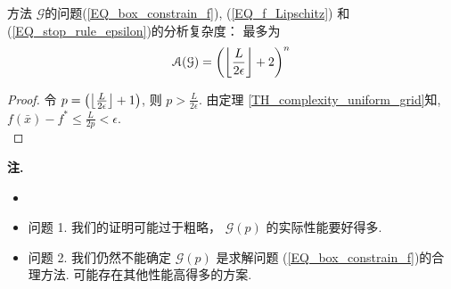 \documentclass[handout]{beamer}
\begin{document}
\begin{frame}[allowframebreaks]
\begin{corollary}
    方法 $\mathcal{G}$的问题(\ref{EQ_box_constrain_f}), (\ref{EQ_f_Lipschitz}) 和  (\ref{EQ_stop_rule_epsilon})的分析复杂度：
     最多为
    \begin{equation*}
        \mathcal{A}(\mathcal{G}) = \left( \bigg{\lfloor}\frac{L}{2\epsilon}\bigg{\rfloor}  +2 \right)^{n}
    \end{equation*}
\end{corollary}


\begin{proof}
    令 $p=\left( \big{\lfloor}\frac{L}{2\epsilon} \big{\rfloor}  +1\right)$, 则 $p> \frac{L}{2\epsilon}$.
    由定理 \ref{TH_complexity_uniform_grid}知, $f(\bar{x}) - f^* \leq \frac{L}{2p} < \epsilon$. \\
\end{proof}

\framebreak

\textbf{注.}

\begin{itemize}
    \item {} 

    \item 问题 1. 我们的证明可能过于粗略， $\mathcal{G}(p)$ 的实际性能要好得多.

    \item 问题 2. 我们仍然不能确定 $\mathcal{G}(p)$ 是求解问题 (\ref{EQ_box_constrain_f})的合理方法. 可能存在其他性能高得多的方案.
\end{itemize}

\end{frame}
\end{document}
